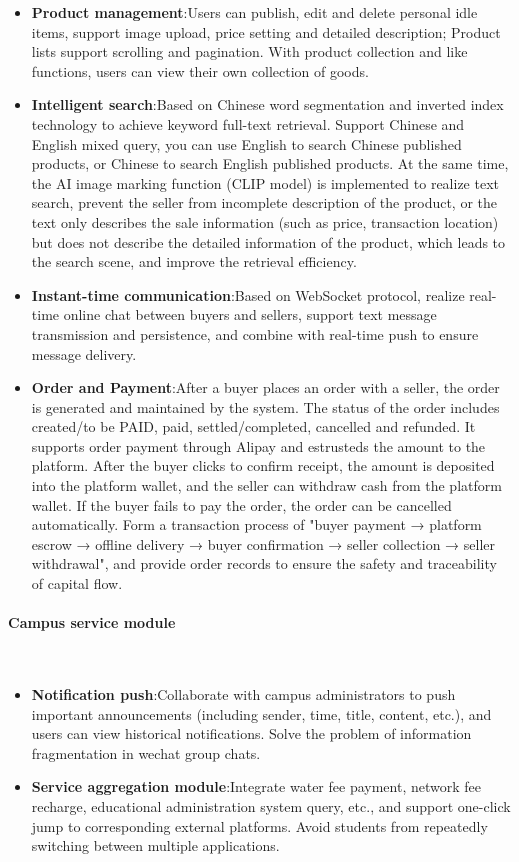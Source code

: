 \documentclass{article}
\begin{document}
\begin{itemize}
    \item \textbf{Product management}:Users can publish, edit and delete personal idle items, support image upload, price setting and detailed description; Product lists support scrolling and pagination. With product collection and like functions, users can view their own collection of goods.
    \item \textbf{Intelligent search}:Based on Chinese word segmentation and inverted index technology to achieve keyword full-text retrieval. Support Chinese and English mixed query, you can use English to search Chinese published products, or Chinese to search English published products. At the same time, the AI image marking function (CLIP model) is implemented to realize text search, prevent the seller from incomplete description of the product, or the text only describes the sale information (such as price, transaction location) but does not describe the detailed information of the product, which leads to the search scene, and improve the retrieval efficiency.
    \item \textbf{Instant-time communication}:Based on WebSocket protocol, realize real-time online chat between buyers and sellers, support text message transmission and persistence, and combine with real-time push to ensure message delivery.
    \item \textbf{ Order and Payment}:After a buyer places an order with a seller, the order is generated and maintained by the system. The status of the order includes created/to be PAID, paid, settled/completed, cancelled and refunded. It supports order payment through Alipay and estrusteds the amount to the platform. After the buyer clicks to confirm receipt, the amount is deposited into the platform wallet, and the seller can withdraw cash from the platform wallet. If the buyer fails to pay the order, the order can be cancelled automatically. Form a transaction process of "buyer payment → platform escrow → offline delivery → buyer confirmation → seller collection → seller withdrawal", and provide order records to ensure the safety and traceability of capital flow.
\end{itemize}

\paragraph{Campus service module}\mbox{}\\

\begin{itemize}
    \item \textbf{Notification push}:Collaborate with campus administrators to push important announcements (including sender, time, title, content, etc.), and users can view historical notifications. Solve the problem of information fragmentation in wechat group chats.
    \item \textbf{Service aggregation module}:Integrate water fee payment, network fee recharge, educational administration system query, etc., and support one-click jump to corresponding external platforms. Avoid students from repeatedly switching between multiple applications. 
\end{itemize}
\end{document}

